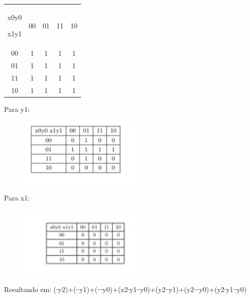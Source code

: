 \documentclass{article}
\begin{document}
\begin{table}[h]
 \centering
 {\renewcommand\arraystretch{1.25}
 \begin{tabular}{ l l l l l }
  \cline{1-1}\cline{2-2}\cline{3-3}\cline{4-4}\cline{5-5}  
    \multicolumn{1}{|c|}{x0y0  			

x1y1} &
    \multicolumn{1}{c|}{00} &
    \multicolumn{1}{c|}{01} &
    \multicolumn{1}{c|}{11} &
    \multicolumn{1}{c|}{10}
  \\  
  \cline{1-1}\cline{2-2}\cline{3-3}\cline{4-4}\cline{5-5}  
    \multicolumn{1}{|c|}{00} &
    \multicolumn{1}{c|}{1} &
    \multicolumn{1}{c|}{1} &
    \multicolumn{1}{c|}{1} &
    \multicolumn{1}{c|}{1}
  \\  
  \cline{1-1}\cline{2-2}\cline{3-3}\cline{4-4}\cline{5-5}  
    \multicolumn{1}{|c|}{01} &
    \multicolumn{1}{c|}{1} &
    \multicolumn{1}{c|}{1} &
    \multicolumn{1}{c|}{1} &
    \multicolumn{1}{c|}{1}
  \\  
  \cline{1-1}\cline{2-2}\cline{3-3}\cline{4-4}\cline{5-5}  
    \multicolumn{1}{|c|}{11} &
    \multicolumn{1}{c|}{1} &
    \multicolumn{1}{c|}{1} &
    \multicolumn{1}{c|}{1} &
    \multicolumn{1}{c|}{1}
  \\  
  \cline{1-1}\cline{2-2}\cline{3-3}\cline{4-4}\cline{5-5}  
    \multicolumn{1}{|c|}{10} &
    \multicolumn{1}{c|}{1} &
    \multicolumn{1}{c|}{1} &
    \multicolumn{1}{c|}{1} &
    \multicolumn{1}{c|}{1}
  \\  
  \hline

 \end{tabular} }
\end{table}

Para y1:
\begin{figure}[!h]
\centering
\includegraphics[width=6cm]{y1.jpeg}
\label{fig:CL_logo}
\end{figure}


Para x1:

\begin{figure}[!h]
\centering
\includegraphics[width=6cm]{x1.jpeg}
\label{fig:CL_logo}
\end{figure}
Resultando em: (∙y2)+(∙∙y1)+(∙∙∙y0)+(x2∙y1∙∙y0)+(y2∙∙y1)+(y2∙∙∙y0)+(y2∙y1∙∙y0)
\end{document}
